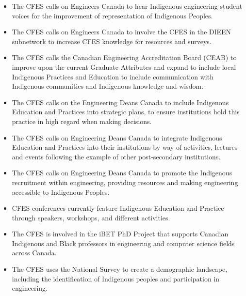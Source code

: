 \begin{itemize}
 \item The CFES calls on Engineers Canada to hear Indigenous engineering student voices for the improvement of representation of Indigenous Peoples.
 \item The CFES calls on Engineers Canada to involve the CFES in the DIEEN subnetwork to increase CFES knowledge for resources and surveys.
 \item The CFES calls the Canadian Engineering Accreditation Board (CEAB) to improve upon the current Graduate Attributes and expand to include local Indigenous Practices and Education to include communication with Indigenous communities and Indigenous knowledge and wisdom.
 \item The CFES calls on the Engineering Deans Canada to include Indigenous Education and Practices into strategic plans, to ensure institutions hold this practice in high regard when making decisions.
 \item The CFES calls on Engineering Deans Canada to integrate Indigenous Education and Practices into their institutions by way of activities, lectures and events following the example of other post-secondary institutions.
 \item The CFES calls on Engineering Deans Canada to promote the Indigenous recruitment within engineering, providing resources and making engineering accessible to Indigenous Peoples.
\end{itemize}

\begin{itemize}
 \item CFES conferences currently feature Indigenous Education and Practice through speakers, workshops, and different activities.
 \item The CFES is involved in the iBET PhD Project that supports Canadian Indigenous and Black professors in engineering and computer science fields across Canada.
 \item The CFES uses the National Survey to create a demographic landscape, including the identification of Indigenous peoples and participation in engineering.
\end{itemize}

